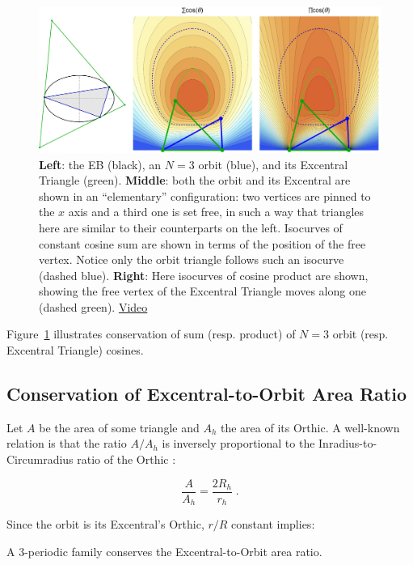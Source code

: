 \begin{figure}
    \centering
    \includegraphics[width=\textwidth]{pics/u0072_cosine_conservation_small.pdf}
    \caption{\textbf{Left}: the EB (black), an $N=3$ orbit (blue), and its Excentral Triangle (green). \textbf{Middle}: both the orbit and its Excentral are shown in an ``elementary'' configuration: two vertices are pinned to the $x$ axis and a third one is set free, in such a way that triangles here are similar to their counterparts on the left. Isocurves of constant cosine sum are shown in terms of the position of the free vertex. Notice only the orbit triangle follows such an isocurve (dashed blue). \textbf{Right}: Here isocurves of cosine product are shown, showing the free vertex of the Excentral Triangle moves along one (dashed green).  \href{https://youtu.be/P8ykpE_ZbZ8}{Video}  \cite[pl\#15]{dsr_math_intell_playlist}}
    \label{fig:conserve_cosines}
\end{figure}

\noindent Figure~\ref{fig:conserve_cosines} illustrates conservation of sum (resp. product) of $N=3$ orbit (resp. Excentral Triangle) cosines.

\subsection{Conservation of Excentral-to-Orbit Area Ratio}

Let $A$ be the area of some triangle and $A_h$ the area of its Orthic. A well-known relation is that the ratio $A/A_h$ is inversely proportional to the Inradius-to-Circumradius ratio of the Orthic \cite{johnson29}:

\begin{equation}\label{eqn:AAh}
\frac{A}{A_h}=\frac{2R_h}{r_h}\;. 
\end{equation}

\noindent Since the orbit is its Excentral's Orthic, $r/R$ constant implies:

\begin{corollary}
\label{cor10}
A 3-periodic family conserves the Excentral-to-Orbit area ratio.
\end{corollary}
